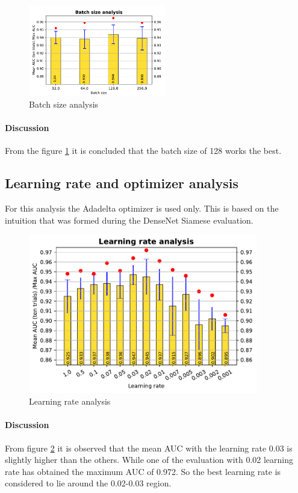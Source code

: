 \begin{figure}[ht]
\centering
\includegraphics[width=6cm]{images/densenet/simple/densenet_simple_batchsize}
\caption{\label{fig:densenet_simple_batchsize}Batch size analysis}
\end{figure}
  
\paragraph{Discussion\\}
From the figure \ref{fig:densenet_simple_batchsize} it is concluded that the batch size of 128 works the best. 
\flushbottom
\newpage

\subsection{Learning rate and optimizer analysis}
For this analysis the Adadelta optimizer is used only. This is based on the intuition that was formed during the DenseNet Siamese evaluation.

\begin{figure}[ht]
\centering
\includegraphics[width=10cm]{images/densenet/simple/densenet_simple_learning_rate}
\caption{\label{fig:densenet_simple_learning_rate}Learning rate analysis}
\end{figure}

\paragraph{Discussion\\} 
From figure \ref{fig:densenet_simple_learning_rate} it is observed that the mean AUC with the learning rate 0.03 is slightly higher than the others. While one of the evaluation with 0.02 learning rate has 
obtained the maximum AUC of 0.972. So the best learning rate is considered to lie around the 0.02-0.03 region.


